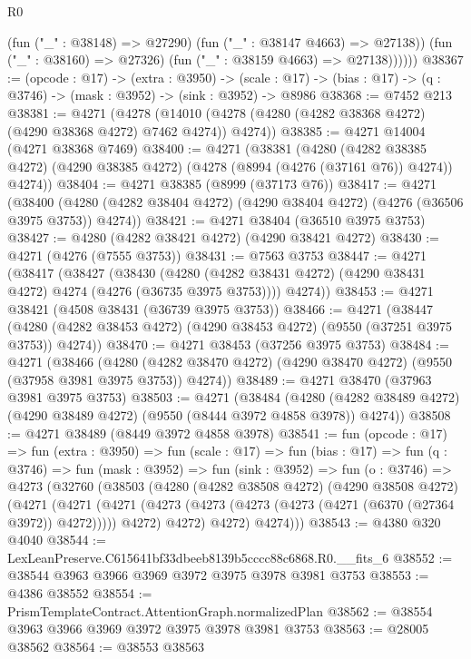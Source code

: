 \begin{lexlean}{R0}
\begin{coremodule}
                (fun ("_" : @38148) => @27290)
                (fun ("_" : @38147 @4663) => @27138))
              (fun ("_" : @38160) => @27326)
              (fun ("_" : @38159 @4663) => @27138))))))
@38367 := (opcode : @17) ->
  (extra : @3950) ->
  (scale : @17) -> (bias : @17) -> (q : @3746) -> (mask : @3952) -> (sink : @3952) -> @8986
@38368 := @7452 @213
@38381 := @4271
    (@4278 (@14010 (@4278 (@4280 (@4282 @38368 @4272) (@4290 @38368 @4272) @7462 @4274)) @4274))
@38385 := @4271 @14004 (@4271 @38368 @7469)
@38400 := @4271
    (@38381
      (@4280
        (@4282 @38385 @4272)
        (@4290 @38385 @4272)
        (@4278 (@8994 (@4276 (@37161 @76)) @4274))
        @4274))
@38404 := @4271 @38385 (@8999 (@37173 @76))
@38417 := @4271
    (@38400 (@4280 (@4282 @38404 @4272) (@4290 @38404 @4272) (@4276 (@36506 @3975 @3753)) @4274))
@38421 := @4271 @38404 (@36510 @3975 @3753)
@38427 := @4280 (@4282 @38421 @4272) (@4290 @38421 @4272)
@38430 := @4271 (@4276 (@7555 @3753))
@38431 := @7563 @3753
@38447 := @4271
    (@38417
      (@38427
        (@38430
          (@4280 (@4282 @38431 @4272) (@4290 @38431 @4272) @4274 (@4276 (@36735 @3975 @3753))))
        @4274))
@38453 := @4271 @38421 (@4508 @38431 (@36739 @3975 @3753))
@38466 := @4271
    (@38447 (@4280 (@4282 @38453 @4272) (@4290 @38453 @4272) (@9550 (@37251 @3975 @3753)) @4274))
@38470 := @4271 @38453 (@37256 @3975 @3753)
@38484 := @4271
    (@38466
      (@4280 (@4282 @38470 @4272) (@4290 @38470 @4272) (@9550 (@37958 @3981 @3975 @3753)) @4274))
@38489 := @4271 @38470 (@37963 @3981 @3975 @3753)
@38503 := @4271
    (@38484
      (@4280 (@4282 @38489 @4272) (@4290 @38489 @4272) (@9550 (@8444 @3972 @4858 @3978)) @4274))
@38508 := @4271 @38489 (@8449 @3972 @4858 @3978)
@38541 := fun (opcode : @17) =>
  fun (extra : @3950) =>
  fun (scale : @17) =>
  fun (bias : @17) =>
  fun (q : @3746) =>
  fun (mask : @3952) =>
  fun (sink : @3952) =>
  fun (o : @3746) =>
  @4273
    (@32760
      (@38503
        (@4280
          (@4282 @38508 @4272)
          (@4290 @38508 @4272)
          (@4271
            (@4271
              (@4271 (@4273 (@4273 (@4273 (@4273 (@4271 (@6370 (@27364 @3972)) @4272))))) @4272)
              @4272)
            @4272)
          @4274)))
@38543 := @4380 @320 @4040
@38544 := LexLeanPreserve.C615641bf33dbeeb8139b5cccc88c6868.R0.__fits_6
@38552 := @38544 @3963 @3966 @3969 @3972 @3975 @3978 @3981 @3753
@38553 := @4386 @38552
@38554 := PrismTemplateContract.AttentionGraph.normalizedPlan
@38562 := @38554 @3963 @3966 @3969 @3972 @3975 @3978 @3981 @3753
@38563 := @28005 @38562
@38564 := @38553 @38563

\end{coremodule}
\end{lexlean}
